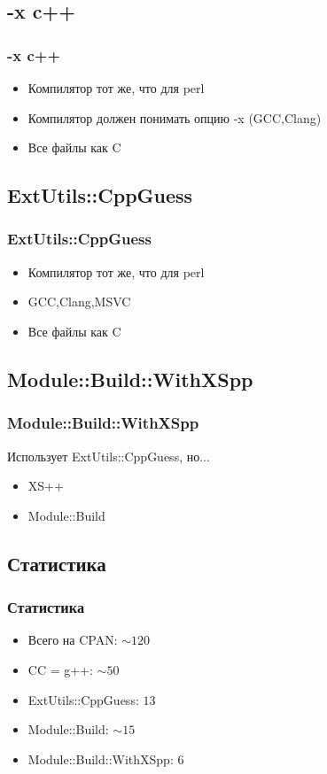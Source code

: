 \documentclass[pdflatex,hyperref={unicode=true}]{beamer}
\DeclareRobustCommand{\cpp}{
    \texorpdfstring{\hbox{C\hspace{-0.5ex}\protect\raisebox{0.5ex}{\protect\scalebox{0.67}{++}}}}{C++}
}
\begin{document}
\subsection{-x c++}
\begin{frame}[fragile]
    \frametitle{-x c++}
    
    \begin{itemize}
        \item Компилятор тот же, что для perl
        \item Компилятор должен понимать опцию -x (GCC,Clang)
        \item Все файлы как \cpp 
    \end{itemize}
\end{frame}

\subsection{ExtUtils::CppGuess}
\begin{frame}[fragile]
    \frametitle{ExtUtils::CppGuess}
    
    \begin{itemize}
        \item Компилятор тот же, что для perl
        \item GCC,Clang,MSVC
        \item Все файлы как \cpp 
    \end{itemize}
\end{frame}

\subsection{Module::Build::WithXSpp}
\begin{frame}
    \frametitle{Module::Build::WithXSpp}
    Использует ExtUtils::CppGuess, но...
    \begin{itemize}
        \item XS++
        \item Module::Build
    \end{itemize}
\end{frame}

\subsection{Статистика}
\begin{frame}
    \frametitle{Статистика}
    \begin{itemize}
        \item Всего на CPAN: $\sim120$
        \item CC = g++: $\sim50$
        \item ExtUtils::CppGuess: $13$
        \item Module::Build: $\sim15$
        \item Module::Build::WithXSpp: $6$
    \end{itemize}
\end{frame}
\end{document}
